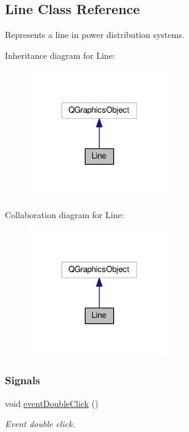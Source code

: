 \hypertarget{class_line}{}\subsection{Line Class Reference}
\label{class_line}


Represents a line in power distribution systems.  




Inheritance diagram for Line\+:
\nopagebreak
\begin{figure}[H]
\begin{center}
\leavevmode
\includegraphics[width=172pt]{class_line__inherit__graph}
\end{center}
\end{figure}


Collaboration diagram for Line\+:
\nopagebreak
\begin{figure}[H]
\begin{center}
\leavevmode
\includegraphics[width=172pt]{class_line__coll__graph}
\end{center}
\end{figure}
\subsubsection*{Signals}
\begin{DoxyCompactItemize}
\item 
void \hyperlink{class_line_a2444b577ea2254994599c6f829c629a5}{event\+Double\+Click} ()
\begin{DoxyCompactList}\small\item\em Event double click. \end{DoxyCompactList}\end{DoxyCompactItemize}
